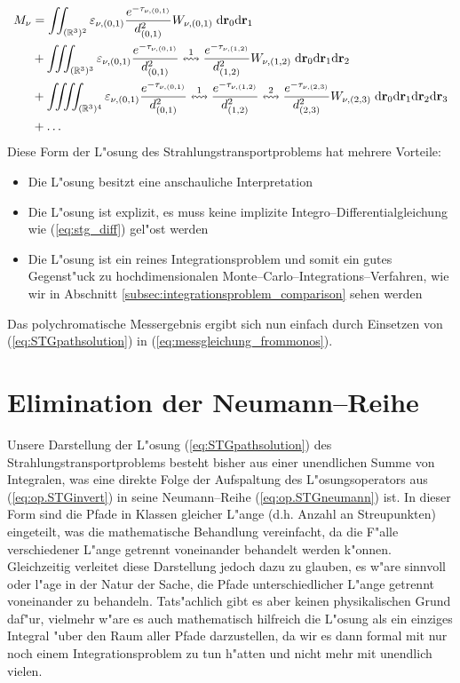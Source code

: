 	\begin{align*}
		M_\nu&=\iint_{(\mathbb{R}^3)^2}\varepsilon_{\nu,(0,1)}\frac{e^{-\tau_{\nu,(0,1)}}}{d_{(0,1)}^2} W_{\nu,(0,1)} \;\text{d}\mathbf{r}_0\text{d}\mathbf{r}_1 \\
		&+\iiint_{(\mathbb{R}^3)^3}\varepsilon_{\nu,(0,1)}\frac{e^{-\tau_{\nu,(0,1)}}}{d_{(0,1)}^2}\overset{1}{\leftrightsquigarrow}\frac{e^{-\tau_{\nu,(1,2)}}}{d_{(1,2)}^2} W_{\nu,(1,2)} \;\text{d}\mathbf{r}_0\text{d}\mathbf{r}_1\text{d}\mathbf{r}_2 \\
		&+\iiiint_{(\mathbb{R}^3)^4}\varepsilon_{\nu,(0,1)}\frac{e^{-\tau_{\nu,(0,1)}}}{d_{(0,1)}^2}\overset{1}{\leftrightsquigarrow}\frac{e^{-\tau_{\nu,(1,2)}}}{d_{(1,2)}^2}\overset{2}{\leftrightsquigarrow}\frac{e^{-\tau_{\nu,(2,3)}}}{d_{(2,3)}^2} W_{\nu,(2,3)} \;\text{d}\mathbf{r}_0\text{d}\mathbf{r}_1\text{d}\mathbf{r}_2\text{d}\mathbf{r}_3 \\
		&+\hdots
	\end{align*}
	Diese Form der L"osung des Strahlungstransportproblems hat mehrere Vorteile:
	\begin{itemize}
		\item{Die L"osung besitzt eine anschauliche Interpretation}
		\item{Die L"osung ist explizit, es muss keine implizite Integro--Differentialgleichung wie (\ref{eq:stg_diff}) gel"ost werden}
		\item{Die L"osung ist ein reines Integrationsproblem und somit ein gutes Gegenst"uck zu hochdimensionalen Monte--Carlo--Integrations--Verfahren, wie wir in Abschnitt \ref{subsec:integrationsproblem_comparison} sehen werden}
	\end{itemize}
	Das polychromatische Messergebnis ergibt sich nun einfach durch Einsetzen von (\ref{eq:STGpathsolution}) in (\ref{eq:messgleichung_frommonos}).


	\section{Elimination der Neumann--Reihe}\label{sec:neumann_elimination}
	Unsere Darstellung der L"osung (\ref{eq:STGpathsolution}) des Strahlungstransportproblems besteht bisher aus einer unendlichen Summe von Integralen, was eine direkte Folge der Aufspaltung des L"osungsoperators aus (\ref{eq:op.STGinvert}) in seine Neumann--Reihe (\ref{eq:op.STGneumann}) ist. In dieser Form sind die Pfade in Klassen gleicher L"ange (d.h. Anzahl an Streupunkten) eingeteilt, was die mathematische Behandlung vereinfacht, da die F"alle verschiedener L"ange getrennt voneinander behandelt werden k"onnen. Gleichzeitig verleitet diese Darstellung jedoch dazu zu glauben, es w"are sinnvoll oder l"age in der Natur der Sache, die Pfade unterschiedlicher L"ange getrennt voneinander zu behandeln. Tats"achlich gibt es aber keinen physikalischen Grund daf"ur, vielmehr w"are es auch mathematisch hilfreich die L"osung als ein einziges Integral "uber den Raum aller Pfade darzustellen, da wir es dann formal mit nur noch einem Integrationsproblem zu tun h"atten und nicht mehr mit unendlich vielen.
	
